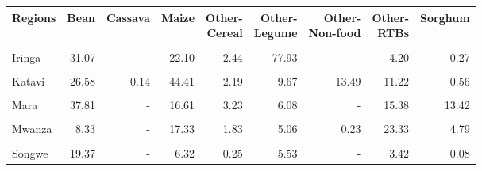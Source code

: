 \begin{table}[!h]
\centering\begingroup\fontsize{7}{9}\selectfont

\begin{tabular}{>{\raggedright\arraybackslash}p{1.8cm}rrrrrrrr}
\toprule
Regions & Bean & Cassava & Maize & \makecell{Other-\\Cereal} & \makecell{Other-\\Legume} & \makecell{Other-\\Non-food} & \makecell{Other-\\RTBs} & Sorghum\\
\midrule
\cellcolor{gray!10}{Geita} & \cellcolor{gray!10}{68.13} & \cellcolor{gray!10}{0.25} & \cellcolor{gray!10}{49.96} & \cellcolor{gray!10}{5.59} & \cellcolor{gray!10}{32.92} & \cellcolor{gray!10}{3.53} & \cellcolor{gray!10}{28.08} & \cellcolor{gray!10}{1.77}\\
Iringa & 31.07 & - & 22.10 & 2.44 & 77.93 & - & 4.20 & 0.27\\
\cellcolor{gray!10}{Kagera} & \cellcolor{gray!10}{313.53} & \cellcolor{gray!10}{1.77} & \cellcolor{gray!10}{141.06} & \cellcolor{gray!10}{51.32} & \cellcolor{gray!10}{58.70} & \cellcolor{gray!10}{47.33} & \cellcolor{gray!10}{93.80} & \cellcolor{gray!10}{78.43}\\
Katavi & 26.58 & 0.14 & 44.41 & 2.19 & 9.67 & 13.49 & 11.22 & 0.56\\
\cellcolor{gray!10}{Kigoma} & \cellcolor{gray!10}{287.18} & \cellcolor{gray!10}{4.52} & \cellcolor{gray!10}{210.07} & \cellcolor{gray!10}{4.70} & \cellcolor{gray!10}{64.73} & \cellcolor{gray!10}{4.67} & \cellcolor{gray!10}{56.38} & \cellcolor{gray!10}{14.46}\\
\addlinespace
Mara & 37.81 & - & 16.61 & 3.23 & 6.08 & - & 15.38 & 13.42\\
\cellcolor{gray!10}{Mbeya} & \cellcolor{gray!10}{83.01} & \cellcolor{gray!10}{-} & \cellcolor{gray!10}{59.17} & \cellcolor{gray!10}{1.32} & \cellcolor{gray!10}{8.89} & \cellcolor{gray!10}{0.02} & \cellcolor{gray!10}{38.97} & \cellcolor{gray!10}{0.96}\\
Mwanza & 8.33 & - & 17.33 & 1.83 & 5.06 & 0.23 & 23.33 & 4.79\\
\cellcolor{gray!10}{Rukwa} & \cellcolor{gray!10}{25.60} & \cellcolor{gray!10}{-} & \cellcolor{gray!10}{12.76} & \cellcolor{gray!10}{5.83} & \cellcolor{gray!10}{12.48} & \cellcolor{gray!10}{-} & \cellcolor{gray!10}{6.05} & \cellcolor{gray!10}{2.35}\\
Songwe & 19.37 & - & 6.32 & 0.25 & 5.53 & - & 3.42 & 0.08\\
\bottomrule
\end{tabular}
\endgroup{}
\end{table}
